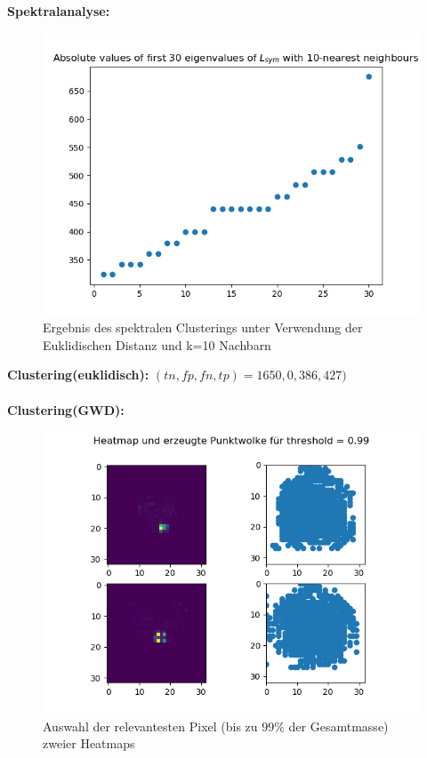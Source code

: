 \documentclass[twoside, 12pt,a4paper]{article}
\numberwithin{equation}{section}
\begin{document}
	\noindent \textbf{Spektralanalyse:}
	
	\begin{figure}[h]
		\begin{center}
			\includegraphics[width=0.5\textheight]{specClustering_l2_k10.png}
			\caption{Ergebnis des spektralen Clusterings unter Verwendung der Euklidischen Distanz und k=10 Nachbarn}
		\end{center}
	\end{figure}
	
	\noindent \textbf{Clustering(euklidisch):}
	$(tn, fp, fn, tp) = 1650, 0, 386, 427)$\\
	\\
	\noindent \textbf{Clustering(GWD):}
	\begin{figure}[h]
		\begin{center}
			\includegraphics[width=0.5\textheight]{HeatmapPunktwolke99.png}
			\caption{Auswahl der relevantesten Pixel (bis zu $99\%$ der Gesamtmasse) zweier Heatmaps}
		\end{center}
	\end{figure}
	
\end{document}
